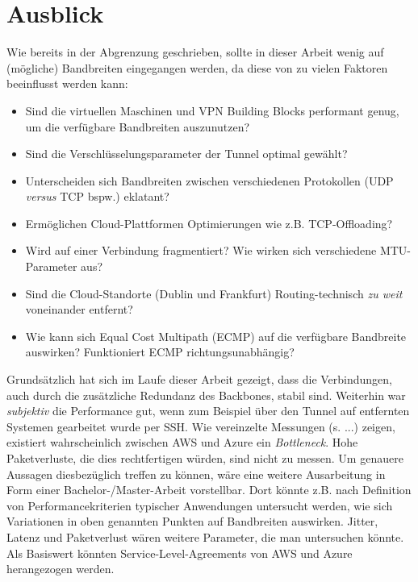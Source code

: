 \section{Ausblick}\label{ausblick}
Wie bereits in der Abgrenzung geschrieben, sollte in dieser Arbeit wenig auf (mögliche) Bandbreiten eingegangen werden, da diese von zu vielen Faktoren beeinflusst werden kann:
\begin{itemize}
    \item Sind die virtuellen Maschinen und VPN Building Blocks performant genug, um die verfügbare Bandbreiten auszunutzen?
    \item Sind die Verschlüsselungsparameter der Tunnel optimal gewählt?
    \item Unterscheiden sich Bandbreiten zwischen verschiedenen Protokollen (UDP \textit{versus} TCP bspw.) eklatant?
    \item Ermöglichen Cloud-Plattformen Optimierungen wie z.B. TCP-Offloading?
    \item Wird auf einer Verbindung fragmentiert? Wie wirken sich verschiedene MTU-Parameter aus?
    \item Sind die Cloud-Standorte (Dublin und Frankfurt) Routing-technisch \textit{zu weit} voneinander entfernt?
    \item Wie kann sich Equal Cost Multipath (ECMP) auf die verfügbare Bandbreite auswirken? Funktioniert ECMP richtungsunabhängig?
\end{itemize}
Grundsätzlich hat sich im Laufe dieser Arbeit gezeigt, dass die Verbindungen, auch durch die zusätzliche Redundanz des Backbones, stabil sind. Weiterhin war \textit{subjektiv} die Performance gut, wenn zum Beispiel über den Tunnel auf entfernten Systemen gearbeitet wurde per SSH. Wie vereinzelte Messungen (s. ...) zeigen, existiert wahrscheinlich zwischen AWS und Azure ein \textit{Bottleneck}. Hohe Paketverluste, die dies rechtfertigen würden, sind nicht zu messen.
Um genauere Aussagen diesbezüglich treffen zu können, wäre eine weitere Ausarbeitung in Form einer Bachelor-/Master-Arbeit vorstellbar. Dort könnte z.B. nach Definition von Performancekriterien typischer Anwendungen untersucht werden, wie sich Variationen in oben genannten Punkten auf Bandbreiten auswirken. Jitter, Latenz und Paketverlust wären weitere Parameter, die man untersuchen könnte. Als Basiswert könnten Service-Level-Agreements von AWS und Azure herangezogen werden.\\

